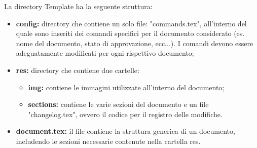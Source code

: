         La directory Template ha la seguente struttura:
        \begin{itemize}
          \item \textbf{config:} directory che contiene un solo file: "commands.tex", all'interno del quale sono inseriti dei comandi specifici per il documento considerato (es. nome del documento, stato di approvazione, ecc...). I comandi devono essere adeguatamente modificati per ogni rispettivo documento;
          \item \textbf{res:} directory che contiene due cartelle:
            \begin{itemize}
              \item \textbf{img:} contiene le immagini utilizzate all'interno del documento;
              \item \textbf{sections:} contiene le varie sezioni del documento e un file "changelog.tex", ovvero il codice per il registro delle modifiche.
            \end{itemize}
          \item \textbf{document.tex:} il file contiene la struttura generica di un documento, includendo le sezioni necessarie contenute nella cartella res.
        \end{itemize}

